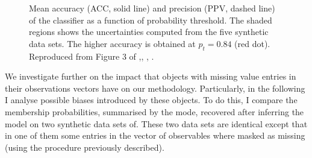 \begin{figure}[ht!]
\begin{center}
\caption{Mean accuracy (ACC, solid line) and precision (PPV, dashed line) of the classifier as a function of probability threshold. The shaded regions shows the uncertainties computed from the five synthetic data sets. The higher accuracy is obtained at $p_t=0.84$ (red dot). Reproduced from Figure 3 of \citet{Olivares2017},\textit{}, , .}
\label{fig:ACC}
\end{center}
\end{figure}

We investigate further on the impact that objects with missing value entries in their observations vectors have on our methodology. Particularly, in the following I analyse possible biases introduced by these objects. To do this, I compare the membership probabilities, summarised by the mode, recovered after inferring the model on two synthetic data sets of. These two data sets are identical except that in one of them some entries in the vector of observables where masked as missing (using the procedure previously described).

